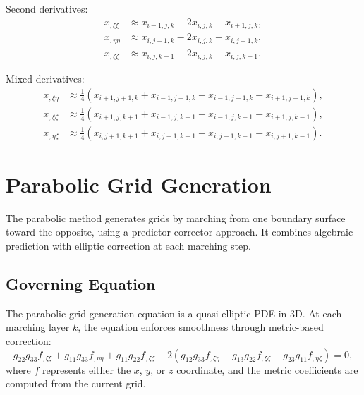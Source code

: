 \documentclass[11pt,a4paper]{report}
\begin{document}
Second derivatives:
\begin{equation}
\begin{aligned}
    x_{,\xi\xi} &\approx x_{i-1,j,k} - 2x_{i,j,k} + x_{i+1,j,k}, \\
    x_{,\eta\eta} &\approx x_{i,j-1,k} - 2x_{i,j,k} + x_{i,j+1,k}, \\
    x_{,\zeta\zeta} &\approx x_{i,j,k-1} - 2x_{i,j,k} + x_{i,j,k+1}.
\end{aligned}
\end{equation}

Mixed derivatives:
\begin{equation}
\begin{aligned}
    x_{,\xi\eta} &\approx \frac{1}{4}(x_{i+1,j+1,k} + x_{i-1,j-1,k} - x_{i-1,j+1,k} - x_{i+1,j-1,k}), \\
    x_{,\xi\zeta} &\approx \frac{1}{4}(x_{i+1,j,k+1} + x_{i-1,j,k-1} - x_{i-1,j,k+1} - x_{i+1,j,k-1}), \\
    x_{,\eta\zeta} &\approx \frac{1}{4}(x_{i,j+1,k+1} + x_{i,j-1,k-1} - x_{i,j-1,k+1} - x_{i,j+1,k-1}).
\end{aligned}
\end{equation}

\chapter{Parabolic Grid Generation}

The parabolic method generates grids by marching from one boundary surface toward the opposite, using a predictor-corrector approach. It combines algebraic prediction with elliptic correction at each marching step.

\section{Governing Equation}

The parabolic grid generation equation is a quasi-elliptic PDE in 3D. At each marching layer $k$, the equation enforces smoothness through metric-based correction:
\begin{equation}
    g_{22} g_{33} f_{,\xi\xi} + g_{11} g_{33} f_{,\eta\eta} + g_{11} g_{22} f_{,\zeta\zeta} - 2(g_{12} g_{33} f_{,\xi\eta} + g_{13} g_{22} f_{,\xi\zeta} + g_{23} g_{11} f_{,\eta\zeta}) = 0,
    \label{eq:para-gov}
\end{equation}
where $f$ represents either the $x$, $y$, or $z$ coordinate, and the metric coefficients are computed from the current grid.
\end{document}
